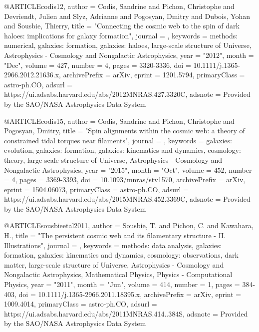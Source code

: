 \documentclass{aa}
\begin{document}
{{{@ARTICLE{codis12,
       author = {{Codis}, Sandrine and {Pichon}, Christophe and {Devriendt}, Julien and
         {Slyz}, Adrianne and {Pogosyan}, Dmitry and {Dubois}, Yohan and
         {Sousbie}, Thierry},
        title = "{Connecting the cosmic web to the spin of dark haloes: implications for galaxy formation}",
      journal = {\mnras},
     keywords = {methods: numerical, galaxies: formation, galaxies: haloes, large-scale structure of Universe, Astrophysics - Cosmology and Nongalactic Astrophysics},
         year = "2012",
        month = "Dec",
       volume = {427},
       number = {4},
        pages = {3320-3336},
          doi = {10.1111/j.1365-2966.2012.21636.x},
archivePrefix = {arXiv},
       eprint = {1201.5794},
 primaryClass = {astro-ph.CO},
       adsurl = {https://ui.adsabs.harvard.edu/abs/2012MNRAS.427.3320C},
      adsnote = {Provided by the SAO/NASA Astrophysics Data System}
}

@ARTICLE{codis15,
       author = {{Codis}, Sandrine and {Pichon}, Christophe and {Pogosyan}, Dmitry},
        title = "{Spin alignments within the cosmic web: a theory of constrained tidal torques near filaments}",
      journal = {\mnras},
     keywords = {galaxies: evolution, galaxies: formation, galaxies: kinematics and dynamics, cosmology: theory, large-scale structure of Universe, Astrophysics - Cosmology and Nongalactic Astrophysics},
         year = "2015",
        month = "Oct",
       volume = {452},
       number = {4},
        pages = {3369-3393},
          doi = {10.1093/mnras/stv1570},
archivePrefix = {arXiv},
       eprint = {1504.06073},
 primaryClass = {astro-ph.CO},
       adsurl = {https://ui.adsabs.harvard.edu/abs/2015MNRAS.452.3369C},
      adsnote = {Provided by the SAO/NASA Astrophysics Data System}
}


@ARTICLE{sousbieetal2011,
       author = {{Sousbie}, T. and {Pichon}, C. and {Kawahara}, H.},
        title = "{The persistent cosmic web and its filamentary structure - II. Illustrations}",
      journal = {\mnras},
     keywords = {methods: data analysis, galaxies: formation, galaxies: kinematics and dynamics, cosmology: observations, dark matter, large-scale structure of Universe, Astrophysics - Cosmology and Nongalactic Astrophysics, Mathematical Physics, Physics - Computational Physics},
         year = "2011",
        month = "Jun",
       volume = {414},
       number = {1},
        pages = {384-403},
          doi = {10.1111/j.1365-2966.2011.18395.x},
archivePrefix = {arXiv},
       eprint = {1009.4014},
 primaryClass = {astro-ph.CO},
       adsurl = {https://ui.adsabs.harvard.edu/abs/2011MNRAS.414..384S},
      adsnote = {Provided by the SAO/NASA Astrophysics Data System}
}

}}}
\end{document}
